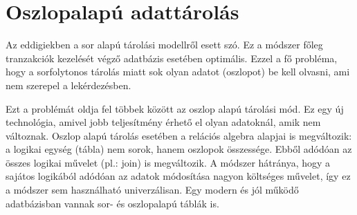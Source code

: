 \documentclass[12pt]{article}
\theoremstyle{plain}
\begin{document}
\section{Oszlopalapú adattárolás}
Az eddigiekben a sor alapú tárolási modellről esett szó. Ez a módszer főleg tranzakciók kezelését végző adatbázis esetében optimális. Ezzel a fő probléma, hogy a sorfolytonos tárolás miatt sok olyan adatot (oszlopot) be kell olvasni, ami nem szerepel a lekérdezésben. \par
Ezt a problémát oldja fel többek között az oszlop alapú tárolási mód. Ez egy új technológia, amivel jobb teljesítmény érhető el olyan adatoknál, amik nem változnak. Oszlop alapú tárolás esetében a relációs algebra alapjai is megváltozik: a logikai egység (tábla) nem sorok, hanem oszlopok összessége. Ebből adódóan az összes logikai művelet (pl.: join) is megváltozik. A módszer hátránya, hogy a sajátos logikából adódóan az adatok módosítása nagyon költséges művelet, így ez a módszer sem használható univerzálisan. Egy modern és jól működő adatbázisban vannak sor- és oszlopalapú táblák is.




\end{document}
